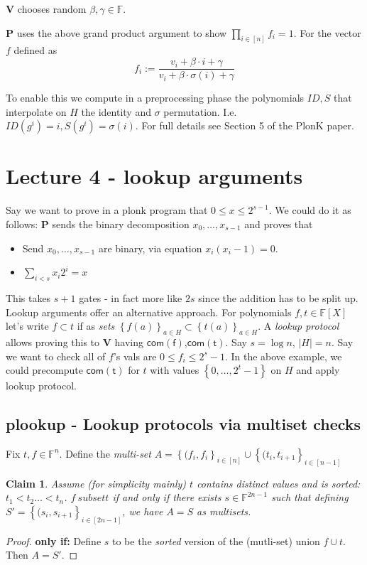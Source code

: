\documentclass[11pt]{article} %
\newcommand{\F}{\ensuremath{\mathbb F}\xspace}
\newcommand{\com}[1]{\ensuremath{\mathsf{com(#1)}}\xspace}
\newcommand{\defeq}{:=}
\newcommand{\sett}[2]{\ensuremath{\set{#1}_{#2}}\xspace}
\newcommand{\prv}{\ensuremath{\mathsf{\mathbf{P}}}\xspace}
\newcommand{\ver}{\ensuremath{\mathsf{\mathbf{V}}}\xspace}
\newcommand{\set}[1]{\ensuremath{\left\{#1\right\}}\xspace}
\newcommand{\polys}{\ensuremath{\F[X]}\xspace}
\newtheorem{claim}[lemma]{Claim}
\begin{document}
\ver chooses random $\beta,\gamma\in \F$.

\prv uses the above grand product argument to show $\prod_{i\in [n]} f_i =1$.
For the vector $f$ defined as
\[f_i \defeq \frac{v_i + \beta \cdot i +\gamma}{v_i + \beta \cdot \sigma(i) +\gamma}\]

To enable this we compute in a preprocessing phase the polynomials $ID,S$ that interpolate on $H$ the identity and $\sigma$ permutation.
I.e. $ID(g^i)=i, S(g^i)=\sigma(i)$.
For full details see Section 5 of the PlonK paper.





\section{Lecture 4 - lookup arguments}
Say we want to prove in a plonk program
that $0\leq x \leq 2^{s-1}$.
We could do it as follows:
\prv sends the binary decomposition $x_0,\ldots,x_{s-1}$
and proves that
\begin{itemize}
 \item Send $x_0,\ldots,x_{s-1}$ are binary, via equation $x_i(x_i-1)=0$.
 \item $\sum_{i<s} x_i2^i =x$
\end{itemize}
This takes $s+1$ gates - in fact more like $2s$ since the addition has to be split up.
Lookup arguments offer an alternative approach.
For polynomials $f,t\in \polys$ let's write $f\subset t$ if as \emph{sets} $\sett{f(a)}{a\in H}\subset \sett{t(a)}{a\in H}$.
A \emph{lookup protocol} allows proving this to \ver having \com{f},\com{t}.
Say $s=\log n$, $|H|=n$. Say we want to check all of $f$'s vals are $0\leq f_i \leq 2^s-1$.
In the above example, we could precompute \com{t} for $t$ with values \set{0,\ldots,2^t-1} on $H$ 
and apply lookup protocol.

\subsection{plookup - Lookup protocols via multiset checks}
Fix $t,f\in \F^n$. Define the \emph{multi-set} 
$A=\set{(f_i,f_i}_{i\in [n]}\cup \sett{(t_i,t_{i+1}}{i \in [n-1]}$

\begin{claim}
Assume (for simplicity mainly) $t$ contains distinct values and is sorted: $t_1<t_2\ldots<t_n$.
 $f\ subset t$ if and only if there exists $s\in \F^{2n-1}$ such that 
defining $S'=\set{(s_i,s_{i+1}}_{i\in [2n-1]}$, 
we have $A=S$ as multisets.
\end{claim}
\begin{proof}
\textbf{only if:}
Define $s$ to be the \emph{sorted} version of the (mutli-set) union $f\cup t$.
Then $A=S'$.
\end{proof}
\end{document}
